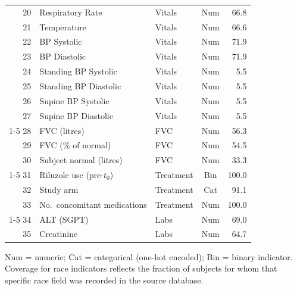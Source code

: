 \begin{table}[ht!]
\begin{tabular}{r l l c r}
20 & Respiratory Rate               & Vitals   & Num &  66.8 \\
21 & Temperature                    & Vitals   & Num &  66.6 \\
22 & BP Systolic                    & Vitals   & Num &  71.9 \\
23 & BP Diastolic                   & Vitals   & Num &  71.9 \\
24 & Standing BP Systolic           & Vitals   & Num &   5.5 \\
25 & Standing BP Diastolic          & Vitals   & Num &   5.5 \\
26 & Supine BP Systolic             & Vitals   & Num &   5.5 \\
27 & Supine BP Diastolic            & Vitals   & Num &   5.5 \\
\cmidrule{1-5}
28 & FVC (litres)                   & FVC      & Num &  56.3 \\
29 & FVC (\% of normal)             & FVC      & Num &  54.5 \\
30 & Subject normal (litres)        & FVC      & Num &  33.3 \\
\cmidrule{1-5}
31 & Riluzole use (pre-$t_0$)       & Treatment & Bin & 100.0 \\
32 & Study arm                      & Treatment & Cat &  91.1 \\
33 & No.\ concomitant medications   & Treatment & Num & 100.0 \\
\cmidrule{1-5}
34 & ALT (SGPT)                     & Labs     & Num &  69.0 \\
35 & Creatinine                     & Labs     & Num &  64.7 \\
\bottomrule
\end{tabular}
\par\smallskip
{\scriptsize Num = numeric; Cat = categorical (one-hot encoded); Bin = binary indicator.
Coverage for race indicators reflects the fraction of subjects for whom that specific race field was recorded in the source database.}
\end{table}
